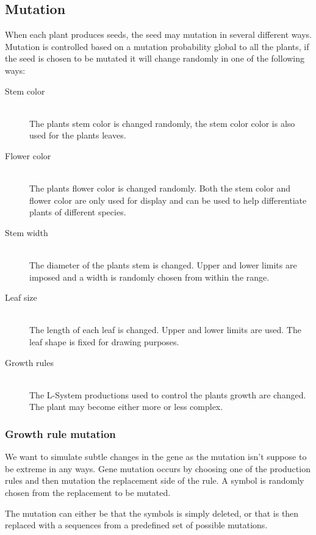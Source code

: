 \documentclass[conference]{acmsiggraph}
\begin{document}
\subsection{Mutation}

When each plant produces seeds, the seed may mutation in several different
ways. Mutation is controlled based on a mutation probability global to all the
plants, if the seed is chosen to be mutated it will change randomly in one of
the following ways:

\begin{description}
  \item[Stem color]   \hfill \\
    The plants stem color is changed randomly, the stem color color is also used
    for the plants leaves.
  \item[Flower color] \hfill \\
    The plants flower color is changed randomly. Both the stem color and flower
    color are only used for display and can be used to help differentiate plants
    of different species.
  \item[Stem width]   \hfill \\
    The diameter of the plants stem is changed. Upper and lower limits are
    imposed and a width is randomly chosen from within the range.
  \item[Leaf size]    \hfill \\
    The length of each leaf is changed. Upper and lower limits are used. The
    leaf shape is fixed for drawing purposes.
  \item[Growth rules] \hfill \\
    The L-System productions used to control the plants growth are changed. The
    plant may become either more or less complex.
\end{description}

\subsubsection{Growth rule mutation}

We want to simulate subtle changes in the gene as the mutation isn't suppose to
be extreme in any ways. Gene mutation occurs by choosing one of the production
rules and then mutation the replacement side of the rule. A symbol is randomly
chosen from the replacement to be mutated.

The mutation can either be that the symbols is simply deleted, or that is then
replaced with a sequences from a predefined set of possible mutations.
\end{document}

